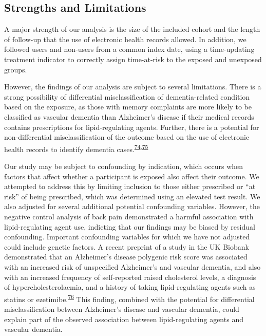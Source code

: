 \documentclass[a4paper, twoside]{templates/ociamthesis}
\begin{document}
\hypertarget{strengths-and-limitations}{%
\subsection{Strengths and Limitations}\label{strengths-and-limitations}}

A major strength of our analysis is the size of the included cohort and the length of follow-up that the use of electronic health records allowed. In addition, we followed users and non-users from a common index date, using a time-updating treatment indicator to correctly assign time-at-risk to the exposed and unexposed groups.

However, the findings of our analysis are subject to several limitations. There is a strong possibility of differential misclassification of dementia-related condition based on the exposure, as those with memory complaints are more likely to be classified as vascular dementia than Alzheimer's disease if their medical records contains prescriptions for lipid-regulating agents. Further, there is a potential for non-differential misclassification of the outcome based on the use of electronic health records to identify dementia cases.\textsuperscript{\protect\hyperlink{ref-wilkinson2018}{74},\protect\hyperlink{ref-mcguinness2019b}{75}}

Our study may be subject to confounding by indication, which occurs when factors that affect whether a participant is exposed also affect their outcome. We attempted to address this by limiting inclusion to those either prescribed or ``at risk'' of being prescribed, which was determined using an elevated test result. We also adjusted for several additional potential confounding variables. However, the negative control analysis of back pain demonstrated a harmful association with lipid-regulating agent use, indicting that our findings may be biased by residual confounding. Important confounding variables for which we have not adjusted could include genetic factors. A recent preprint of a study in the UK Biobank demonstrated that an Alzheimer's disease polygenic risk score was associated with an increased risk of unspecified Alzheimer's and vascular dementia, and also with an increased frequency of self-reported raised cholesterol levels, a diagnosis of hypercholesterolaemia, and a history of taking lipid-regulating agents such as statins or ezetimibe.\textsuperscript{\protect\hyperlink{ref-korologou-linden2020}{76}} This finding, combined with the potential for differential misclassification between Alzheimer's disease and vascular dementia, could explain part of the observed association between lipid-regulating agents and vascular dementia.
\end{document}
